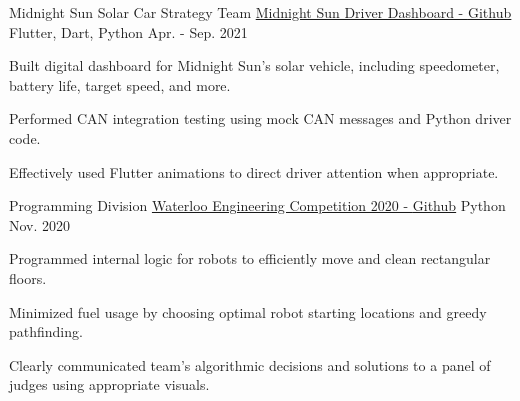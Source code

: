 

\begin{cventries}

  \cventry
    {Midnight Sun Solar Car Strategy Team} %
    {\href{https://github.com/uw-midsun/telemetry_xiv}{Midnight Sun Driver Dashboard - \underline{Github}}} %
    {Flutter, Dart, Python} %
    {Apr. - Sep. 2021} %
    {
      \begin{cvitems} %
        \item {Built digital dashboard for Midnight Sun's solar vehicle, including speedometer, battery life, target speed, and more.}
        \item {Performed CAN integration testing using mock CAN messages and Python driver code.}
        \item {Effectively used Flutter animations to direct driver attention when appropriate.}
      \end{cvitems}
    }

  \cventry
    {Programming Division} %
    {\href{https://github.com/danielq987/WECF2020}{Waterloo Engineering Competition 2020 - \underline{Github}}} %
    {Python} %
    {Nov. 2020} %
    {
      \begin{cvitems} %
        \item {Programmed internal logic for robots to efficiently move and clean rectangular floors.}
        \item {Minimized fuel usage by choosing optimal robot starting locations and greedy pathfinding.}
        \item {Clearly communicated team's algorithmic decisions and solutions to a panel of judges using appropriate visuals.}
      \end{cvitems}
    }


\end{cventries}
